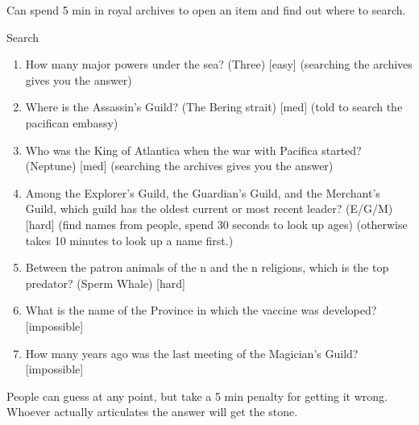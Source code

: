 \documentclass[green]{NeptuneBall}
\begin{document}
\name{\gWishingStone{}}

Can spend 5 min in royal archives to open an item and find out where to search.

Search

\begin{enumerate}
\item How many major powers under the sea? (Three)  [easy]  (searching the archives gives you the answer)
\item Where is the Assassin's Guild? (The Bering strait) [med]  (told to search the pacifican embassy)
\item Who was the King of Atlantica when the war with Pacifica started? (Neptune) [med]  (searching the archives gives you the answer)
\item Among the Explorer's Guild, the Guardian's Guild, and the Merchant's Guild, which guild has the oldest current or most recent leader? (E/G/M) [hard] (find names from people, spend 30 seconds to look up ages) (otherwise takes 10 minutes to look up a name first.)
\item Between the patron animals of the \pPacifica{}n and the \pAtlantica{}n religions, which is the top predator? (Sperm Whale) [hard]
\item What is the name of the Province in which the \pPolio{} vaccine was developed? [impossible]
\item How many years ago was the last meeting of the Magician's Guild?[impossible]
\end{enumerate}

People can guess at any point, but take a 5 min penalty for getting it wrong. Whoever actually articulates the answer will get the stone.
\end{document}
